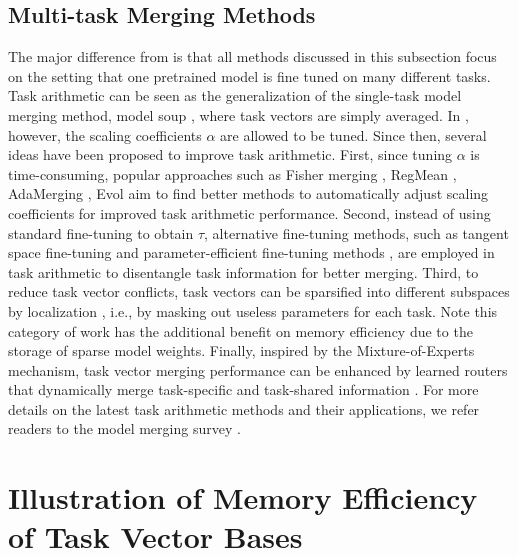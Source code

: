 \subsection{Multi-task Merging Methods}
The major difference from  is that all methods discussed in this subsection focus on the setting that one pretrained model is fine tuned on many different tasks. Task arithmetic \citep{ilharco2022editing} can be seen as the generalization of the single-task model merging method, model soup \citep{pmlr-v162-wortsman22a}, where task vectors are simply averaged. In \citet{ilharco2022editing}, however, the scaling coefficients $\alpha$ are allowed to be tuned. Since then, several ideas have been proposed to improve task arithmetic. First, since tuning $\alpha$ is time-consuming, popular approaches such as Fisher merging \citep{matena2022merging}, RegMean \citep{jin2022dataless}, AdaMerging \citep{yang2023adamerging}, Evol \citep{akiba2024evolutionary} aim to find better methods to automatically adjust scaling coefficients for improved task arithmetic performance. Second, instead of using standard fine-tuning to obtain $\tau$, alternative fine-tuning methods, such as tangent space fine-tuning \citep{ortiz2024task} and parameter-efficient fine-tuning methods \citep{zhang2023composing, tang2023parameter, stoica2024model}, are employed in task arithmetic to disentangle task information for better merging. Third, to reduce task vector conflicts, task vectors can be sparsified into different subspaces by localization \citep{he2024localize, yadav2024ties, yu2024language, davari2025model, tang2023concrete, wang2024localizing}, i.e., by masking out useless parameters for each task. Note this category of work has the additional benefit on memory efficiency due to the storage of sparse model weights. Finally, inspired by the Mixture-of-Experts \citep{shazeer2017outrageously} mechanism, task vector merging performance can be enhanced by learned routers that dynamically merge task-specific and task-shared information \citep{lu2024twin, tang2024merging}. For more details on the latest task arithmetic methods and their applications, we refer readers to the model merging survey \citep{yang2024model}. 

\section{Illustration of Memory Efficiency of Task Vector Bases}

